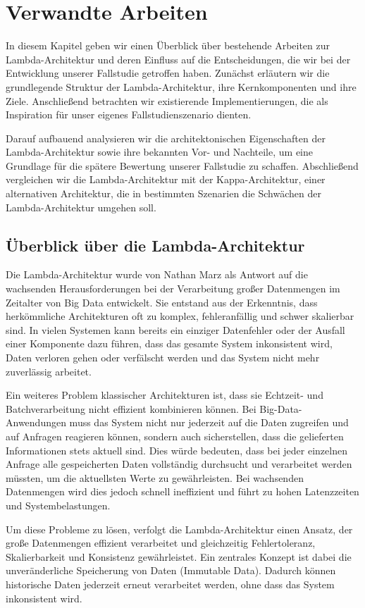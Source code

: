 \chapter{Verwandte Arbeiten}
In diesem Kapitel geben wir einen Überblick über bestehende Arbeiten zur Lambda-Architektur und deren Einfluss auf die Entscheidungen, die wir bei der Entwicklung unserer Fallstudie getroffen haben. Zunächst erläutern wir die grundlegende Struktur der Lambda-Architektur, ihre Kernkomponenten und ihre Ziele. Anschließend betrachten wir existierende Implementierungen, die als Inspiration für unser eigenes Fallstudienszenario dienten.

Darauf aufbauend analysieren wir die architektonischen Eigenschaften der Lambda-Architektur sowie ihre bekannten Vor- und Nachteile, um eine Grundlage für die spätere Bewertung unserer Fallstudie zu schaffen. Abschließend vergleichen wir die Lambda-Architektur mit der Kappa-Architektur, einer alternativen Architektur, die in bestimmten Szenarien die Schwächen der Lambda-Architektur umgehen soll.

\section{Überblick über die Lambda-Architektur}
Die Lambda-Architektur wurde von Nathan Marz \cite{warren2015big} als Antwort auf die wachsenden Herausforderungen bei der Verarbeitung großer Datenmengen im Zeitalter von Big Data entwickelt. Sie entstand aus der Erkenntnis, dass herkömmliche Architekturen oft zu komplex, fehleranfällig und schwer skalierbar sind. In vielen Systemen kann bereits ein einziger Datenfehler oder der Ausfall einer Komponente dazu führen, dass das gesamte System inkonsistent wird, Daten verloren gehen oder verfälscht werden und das System nicht mehr zuverlässig arbeitet.

Ein weiteres Problem klassischer Architekturen ist, dass sie Echtzeit- und Batchverarbeitung nicht effizient kombinieren können. Bei Big-Data-Anwendungen muss das System nicht nur jederzeit auf die Daten zugreifen und auf Anfragen reagieren können, sondern auch sicherstellen, dass die gelieferten Informationen stets aktuell sind. Dies würde bedeuten, dass bei jeder einzelnen Anfrage alle gespeicherten Daten vollständig durchsucht und verarbeitet werden müssten, um die aktuellsten Werte zu gewährleisten. Bei wachsenden Datenmengen wird dies jedoch schnell ineffizient und führt zu hohen Latenzzeiten und Systembelastungen.

Um diese Probleme zu lösen, verfolgt die Lambda-Architektur einen Ansatz, der große Datenmengen effizient verarbeitet und gleichzeitig Fehlertoleranz, Skalierbarkeit und Konsistenz gewährleistet. Ein zentrales Konzept ist dabei die unveränderliche Speicherung von Daten (Immutable Data). Dadurch können historische Daten jederzeit erneut verarbeitet werden, ohne dass das System inkonsistent wird.

